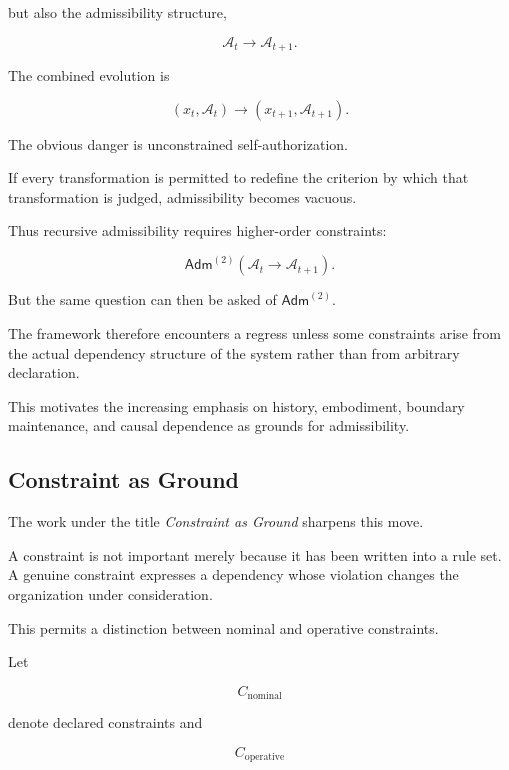 \documentclass[11pt]{article}
\theoremstyle{remark}
\newcommand{\Adm}{\mathcal{A}}
\begin{document}
but also the admissibility structure,

\begin{equation}
\Adm_t\rightarrow\Adm_{t+1}.
\end{equation}

The combined evolution is

\begin{equation}
(x_t,\Adm_t)
\longrightarrow
(x_{t+1},\Adm_{t+1}).
\end{equation}

The obvious danger is unconstrained self-authorization.

If every transformation is permitted to redefine the criterion by which that transformation is judged, admissibility becomes vacuous.

Thus recursive admissibility requires higher-order constraints:

\begin{equation}
\mathsf{Adm}^{(2)}
\left(
\Adm_t\rightarrow\Adm_{t+1}
\right).
\end{equation}

But the same question can then be asked of $\mathsf{Adm}^{(2)}$.

The framework therefore encounters a regress unless some constraints arise from the actual dependency structure of the system rather than from arbitrary declaration.

This motivates the increasing emphasis on history, embodiment, boundary maintenance, and causal dependence as grounds for admissibility.

\subsection{Constraint as Ground}

The work under the title \emph{Constraint as Ground} sharpens this move.

A constraint is not important merely because it has been written into a rule set. A genuine constraint expresses a dependency whose violation changes the organization under consideration.

This permits a distinction between nominal and operative constraints.

Let

\begin{equation}
C_{\mathrm{nominal}}
\end{equation}

denote declared constraints and

\begin{equation}
C_{\mathrm{operative}}
\end{equation}
\end{document}
